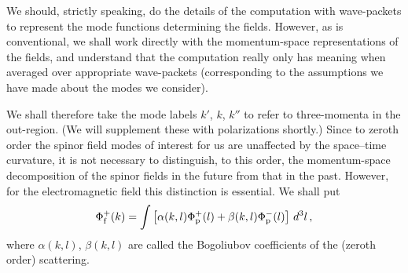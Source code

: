 \documentclass[11pt]{article}
\begin{document}
We should, strictly speaking, do the details of the computation with
wave-packets to represent the mode functions determining the fields.  However,
as is conventional, we shall work directly with the momentum-space
representations of the fields, and understand that the computation really only
has meaning when averaged over appropriate wave-packets (corresponding to the
assumptions we have made about the modes we consider).


We shall therefore take the mode labels $k'$, $k$, $k''$ to refer to
three-momenta in the out-region.  (We will supplement these with polarizations
shortly.) 
Since to zeroth order the spinor field modes of interest for us are unaffected
by the space--time curvature, it is not necessary to distinguish, to this
order, the momentum-space decomposition of the spinor fields in the future from
that in the past.  However, for the electromagnetic field this distinction is
essential.  We shall put
\begin{equation}
\Phi ^+_{\rm f}(k)=\int \left[ \alpha (k,l)\Phi ^+_{\rm p}(l) +\beta (k,l)\Phi
^-_{\rm p}(l)\right]\, d^3l\, ,
\end{equation}
where $\alpha (k,l)$, $\beta (k,l)$ are called the Bogoliubov coefficients of 
the (zeroth order) scattering.  
\end{document}
